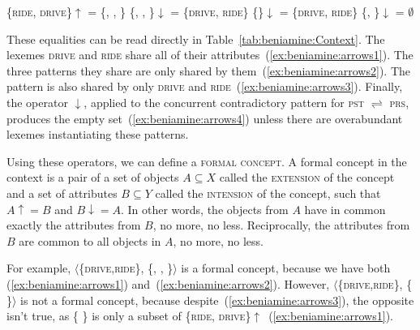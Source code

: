 \documentclass[output=paper]{langscibook}
\begin{document}
    \begin{exe}
        \ex \label{ex:beniamine:arrows1} \{\textsc{ride}, \textsc{drive}\}$\uparrow$ = \{, , \}
        \ex \label{ex:beniamine:arrows2} \{, , \}$\downarrow$ = \{\textsc{drive}, \textsc{ride}\}
        \ex \label{ex:beniamine:arrows3} \{\}$\downarrow$ = \{\textsc{drive}, \textsc{ride}\}
        \ex \label{ex:beniamine:arrows4} \{, \}$\downarrow$ = $\emptyset$
    \end{exe}

    These equalities can be read directly in Table~\ref{tab:beniamine:Context}. The lexemes  \textsc{drive} and \textsc{ride} share all of their attributes~(\ref{ex:beniamine:arrows1}). The three patterns they share are only shared by them~(\ref{ex:beniamine:arrows2}). The pattern  is also shared by only \textsc{drive} and \textsc{ride}~(\ref{ex:beniamine:arrows3}). Finally, the operator $\downarrow$, applied to the concurrent contradictory pattern for \textsc{pst} $\rightleftharpoons$ \textsc{prs}, produces the empty set~(\ref{ex:beniamine:arrows4}) unless there are overabundant lexemes instantiating these patterns.

    Using these operators, we can define a \textsc{formal concept}. A formal concept in the context \context{} is a pair \concept{} of a set of objects $A \subseteq X$ called the \textsc{extension} of the concept and a set of attributes $B \subseteq Y$ called the \textsc{intension} of the concept, such that $A\uparrow = B$ and $B\downarrow = A$. In other words, the objects from $A$ have in common exactly the attributes from $B$, no more, no less. Reciprocally, the attributes from $B$ are common to all objects in $A$, no more, no less.

    \begin{sloppypar}
      For example, $\langle$\{\textsc{drive},\textsc{ride}\},
      \{, ,
       \}$\rangle$ is a formal concept,
      because we have both (\ref{ex:beniamine:arrows1})
      and~(\ref{ex:beniamine:arrows2}). However,
      $\langle$\{\textsc{drive},\textsc{ride}\}, \{ \}$\rangle$ is not a formal concept, because
      despite~(\ref{ex:beniamine:arrows3}), the opposite isn't true,
      as \{ \} is only a subset of
      \{\textsc{ride},
      \textsc{drive}\}$\uparrow$~(\ref{ex:beniamine:arrows1}).
    \end{sloppypar}
\end{document}
